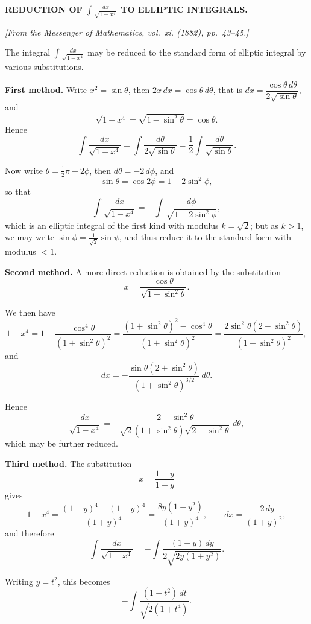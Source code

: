 \documentclass[12pt,a4paper]{article}
\begin{document}
\begin{center}
\textbf{REDUCTION OF $\displaystyle\int \frac{dx}{\sqrt{1-x^4}}$ TO ELLIPTIC INTEGRALS.}
\end{center}

\begin{flushright}
\textit{[From the Messenger of Mathematics, vol.~xi. (1882), pp.~43--45.]}
\end{flushright}

The integral $\displaystyle\int \frac{dx}{\sqrt{1-x^4}}$ may be reduced to the standard
form of elliptic integral by various substitutions.

\textbf{First method.} Write $x^2 = \sin\theta$, then $2x\,dx = \cos\theta\,d\theta$, that is
$dx = \dfrac{\cos\theta\,d\theta}{2\sqrt{\sin\theta}}$, and
%
\[
\sqrt{1-x^4} = \sqrt{1-\sin^2\theta} = \cos\theta.
\]
%
Hence
%
\[
\int \frac{dx}{\sqrt{1-x^4}}
= \int \frac{d\theta}{2\sqrt{\sin\theta}}
= \frac{1}{2} \int \frac{d\theta}{\sqrt{\sin\theta}}.
\]

Now write $\theta = \tfrac{1}{2}\pi - 2\phi$, then $d\theta = -2\,d\phi$, and
%
\[
\sin\theta = \cos 2\phi = 1 - 2\sin^2\phi,
\]
%
so that
%
\[
\int \frac{dx}{\sqrt{1-x^4}}
= -\int \frac{d\phi}{\sqrt{1-2\sin^2\phi}},
\]
%
which is an elliptic integral of the first kind with modulus $k = \sqrt{2}$;
but as $k > 1$, we may write $\sin\phi = \tfrac{1}{\sqrt{2}} \sin\psi$, and thus reduce it
to the standard form with modulus $< 1$.

\textbf{Second method.} A more direct reduction is obtained by the substitution
%
\[
x = \frac{\cos\theta}{\sqrt{1+\sin^2\theta}}.
\]

We then have
%
\[
1 - x^4 = 1 - \frac{\cos^4\theta}{(1+\sin^2\theta)^2}
= \frac{(1+\sin^2\theta)^2 - \cos^4\theta}{(1+\sin^2\theta)^2}
= \frac{2\sin^2\theta(2-\sin^2\theta)}{(1+\sin^2\theta)^2},
\]
and
%
\[
dx = -\frac{\sin\theta(2+\sin^2\theta)}{(1+\sin^2\theta)^{3/2}}\,d\theta.
\]

Hence
%
\[
\frac{dx}{\sqrt{1-x^4}}
= -\frac{2+\sin^2\theta}{\sqrt{2}(1+\sin^2\theta)\sqrt{2-\sin^2\theta}}\,d\theta,
\]
%
which may be further reduced.

\textbf{Third method.} The substitution
%
\[
x = \frac{1-y}{1+y}
\]
%
gives
%
\[
1 - x^4 = \frac{(1+y)^4 - (1-y)^4}{(1+y)^4}
= \frac{8y(1+y^2)}{(1+y)^4},
\qquad
dx = \frac{-2\,dy}{(1+y)^2},
\]
%
and therefore
%
\[
\int \frac{dx}{\sqrt{1-x^4}}
= -\int \frac{(1+y)\,dy}{2\sqrt{2y(1+y^2)}}.
\]

Writing $y = t^2$, this becomes
%
\[
-\int \frac{(1+t^2)\,dt}{\sqrt{2(1+t^4)}}.
\]
\end{document}

